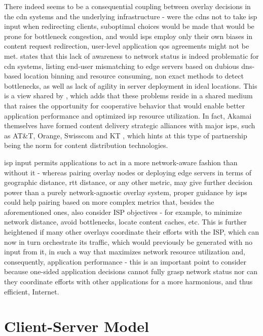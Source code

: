     There indeed seems to be a consequential coupling between overlay decisions in the \gls{cdn} systems and the underlying infrastructure - were the \glspl{cdn} not to take \gls{isp} input when redirecting clients, suboptimal choices would be made that would be prone for bottleneck congestion, and would \glspl{isp} employ only their own biases in content request redirection, user-level application \gls{qos} agreements might not be met.
        \cite{pushing-cdn-isp-collaboration} states that this lack of awareness to network status is indeed problematic for \gls{cdn} systems, listing end-user mismatching to edge servers based on dubious \gls{dns}-based location binning and resource consuming, non exact methods to detect bottlenecks, as well as lack of agility in server deployment in ideal locations.
        This is a view shared by \cite{cdn-isp-cooperations}, which adds that these problems reside in a shared medium that raises the opportunity for cooperative behavior that would enable better application performance and optimized \gls{isp} resource utilization.
        In fact, Akamai themselves have formed content delivery strategic alliances with major \glspl{isp}, such as AT\&T, Orange, Swisscom and KT \cite{pushing-cdn-isp-collaboration}, which hints at this type of partnership being the norm for content distribution technologies. 

        \gls{isp} input permits applications to act in a more network-aware fashion than without it - whereas pairing overlay nodes or deploying edge servers in terms of geographic distance, \gls{rtt} distance, or any other metric, may give further decision power than a purely network-agnostic overlay system, proper guidance by \glspl{isp} could help pairing based on more complex metrics that, besides the aforementioned ones, also consider ISP objectives - for example, to minimize network distance, avoid bottlenecks, locate content caches, etc.
        This is further heightened if many other overlays coordinate their efforts with the ISP, which can now in turn orchestrate its traffic, which would previously be generated with no input from it, in such a way that maximizes network resource utilization and, consequently, application performance - this is an important point to consider because one-sided application decisions cannot fully grasp network status nor can they coordinate efforts with other applications for a more harmonious, and thus efficient, Internet.


\section{Client-Server Model}

